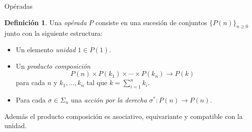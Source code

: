 \documentclass[12pt,aspectratio=169]{beamer}
\numberwithin{equation}{section}
\theoremstyle{definition}
\newtheorem{defi}[teo]{Definici\'on}
\begin{document}
{%



\begin{frame}{Op\'eradas}
    \begin{defi}
        Una \emph{op\'erada} $P$ consiste en una sucesi\'on de conjuntos $\{P(n)\}_{n\ge 0}$ junto con la siguiente estructura:
        \begin{itemize}
            \item Un elemento \emph{unidad} $1\in P(1)$.
            \item Un \emph{producto composici\'on}
                  $$
                      P(n)\times P(k_1) \times\cdots\times P(k_n)\longrightarrow P(k)
                  $$
                  para cada $n$ y $k_1,\dots,k_n$ tal que $k=\sum_{i=1}^{n}{k_i}$.
            \item Para cada $\sigma\in\Sigma_n$ una \emph{acci\'on por la derecha} $\sigma^*\colon P(n)\to P(n)$.
        \end{itemize}
        Adem\'as el producto composici\'on es asociativo, equivariante y compatible con la unidad.
    \end{defi}


\end{frame}}
\end{document}
